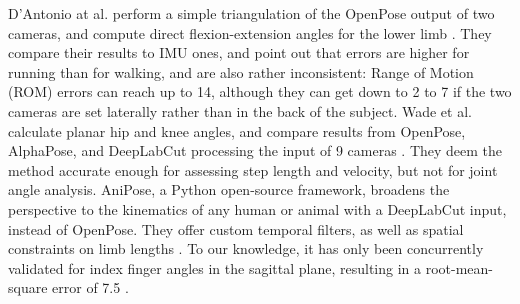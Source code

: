 D’Antonio at al. perform a simple triangulation of the OpenPose output of two cameras, and compute direct flexion-extension angles for the lower limb \cite{D'Antonio2021}. They compare their results to IMU ones, and point out that errors are higher for running than for walking, and are also rather inconsistent: Range of Motion (ROM) errors can reach up to 14\degree{}, although they can get down to 2 to 7\degree{} if the two cameras are set laterally rather than in the back of the subject. Wade et al. calculate planar hip and knee angles, and compare results from OpenPose, AlphaPose, and DeepLabCut processing the input of 9 cameras \cite{Wade2021}. They deem the method accurate enough for assessing step length and velocity, but not for joint angle analysis. AniPose, a Python open-source framework, broadens the perspective to the kinematics of any human or animal with a DeepLabCut input, instead of OpenPose. They offer custom temporal filters, as well as spatial constraints on limb lengths \cite{Karashchuk2021}. To our knowledge, it has only been concurrently validated for index finger angles in the sagittal plane, resulting in a root-mean-square error of 7.5\degree{} \cite{Geelen2021}.

